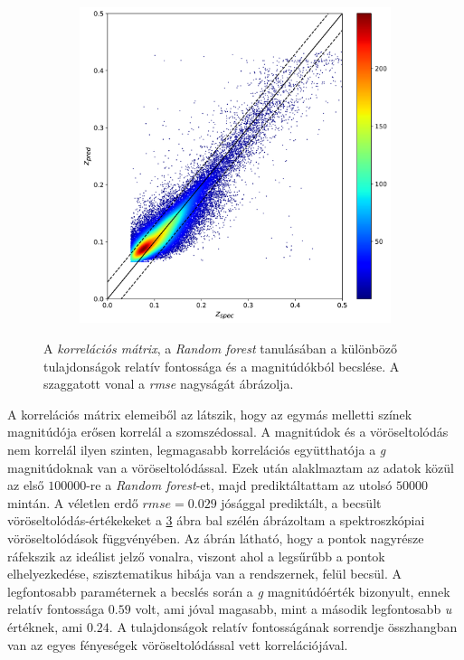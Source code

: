 \documentclass[12pt,letterpaper,twoside,openright]{book}
\begin{document}
\begin{figure}[]
\begin{subfigure}[b]{0.32\textwidth}
    \label{fig:2}
  \end{subfigure}
  \hspace{0cm}
  \begin{subfigure}[b]{0.32\textwidth}
    \includegraphics[width=\textwidth, height = 0.95\textwidth]{Figures/plotbaselineRF.png}
    \label{fig:2}
  \end{subfigure}
  \caption{A \textit{korrelációs mátrix}, a \textit{Random forest} tanulásában a különböző tulajdonságok relatív fontossága és a magnitúdókból becslése. A szaggatott vonal a \textit{rmse} nagyságát ábrázolja.}
  \label{fig:dist2}
 \end{figure}
A korrelációs mátrix elemeiből az látszik, hogy az egymás melletti színek magnitúdója erősen korrelál a szomszédossal. A magnitúdok és a vöröseltolódás nem korrelál ilyen szinten, legmagasabb korrelációs együtthatója a \textit{g} magnitúdoknak van a vöröseltolódással. Ezek után alaklmaztam az adatok közül az első $\num{100000}$-re a \textit{Random forest}-et, majd prediktáltattam az utolsó $\num{50000}$ mintán. A véletlen erdő $rmse =0.029$ jósággal prediktált, a becsült vöröseltolódás-értékekeket a \ref{fig:dist2} ábra bal szélén ábrázoltam a spektroszkópiai vöröseltolódások függvényében. Az ábrán látható, hogy a pontok nagyrésze ráfekszik az ideálist jelző vonalra, viszont ahol a legsűrűbb a pontok elhelyezkedése, szisztematikus hibája van a rendszernek, felül becsül. A legfontosabb paraméternek a becslés során a \textit{g} magnitúdóérték bizonyult, ennek relatív fontossága $0.59$ volt, ami jóval magasabb, mint a második legfontosabb \textit{u} értéknek, ami $0.24$. A tulajdonságok relatív fontosságának sorrendje összhangban van az egyes fényeségek vöröseltolódással vett korrelációjával.
\end{document}

